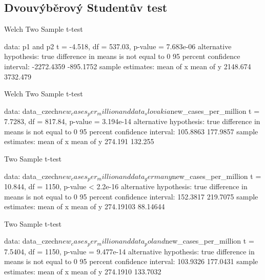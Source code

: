 \documentclass[a4paper]{ article}
\begin{document}
\clearpage

\subsection{Dvouvýběrový Studentův test}
\begin{Schunk}
\begin{Soutput}
	Welch Two Sample t-test

data:  p1 and p2
t = -4.518, df = 537.03, p-value = 7.683e-06
alternative hypothesis: true difference in means is not equal to 0
95 percent confidence interval:
 -2272.4359  -895.1752
sample estimates:
mean of x mean of y 
 2148.674  3732.479 
\end{Soutput}
\end{Schunk}

\begin{Schunk}
\begin{Soutput}
	Welch Two Sample t-test

data:  data_czech$new_cases_per_million and data_slovakia$new_cases_per_million
t = 7.7283, df = 817.84, p-value = 3.194e-14
alternative hypothesis: true difference in means is not equal to 0
95 percent confidence interval:
 105.8863 177.9857
sample estimates:
mean of x mean of y 
  274.191   132.255 
\end{Soutput}
\end{Schunk}

\begin{Schunk}
\begin{Soutput}
	Two Sample t-test

data:  data_czech$new_cases_per_million and data_germany$new_cases_per_million
t = 10.844, df = 1150, p-value < 2.2e-16
alternative hypothesis: true difference in means is not equal to 0
95 percent confidence interval:
 152.3817 219.7075
sample estimates:
mean of x mean of y 
274.19103  88.14644 
\end{Soutput}
\end{Schunk}

\clearpage

\begin{Schunk}
\begin{Soutput}
	Two Sample t-test

data:  data_czech$new_cases_per_million and data_poland$new_cases_per_million
t = 7.5404, df = 1150, p-value = 9.477e-14
alternative hypothesis: true difference in means is not equal to 0
95 percent confidence interval:
 103.9326 177.0431
sample estimates:
mean of x mean of y 
 274.1910  133.7032 
\end{Soutput}
\end{Schunk}
\end{document}
